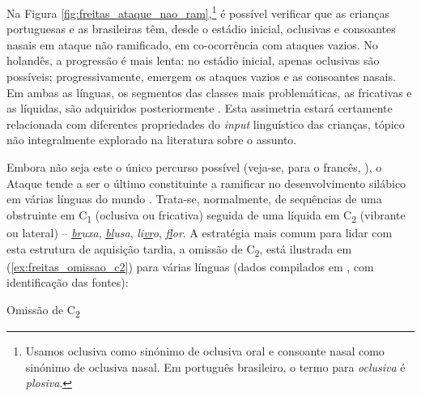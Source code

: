 \documentclass[output=paper]{LSP/langsci}
\begin{document}
Na Figura \ref{fig:freitas_ataque_nao_ram},\footnote{Usamos oclusiva como sinónimo de oclusiva oral e consoante nasal como sinónimo de oclusiva nasal. Em português brasileiro, o termo para \textit{oclusiva} é \textit{plosiva}.} é possível verificar que as crianças portuguesas e as brasileiras têm, desde o estádio inicial, oclusivas e consoantes nasais em ataque não ramificado, em co-ocorrência com ataques vazios. No holandês, a progressão é mais lenta: no estádio inicial, apenas oclusivas são possíveis; progressivamente, emergem os ataques vazios e as consoantes nasais. Em ambas as línguas, os segmentos das classes mais problemáticas, as fricativas e as líquidas, são adquiridos posteriormente \citep{matzenauer1990,freitas1997,costa2010,amorim2014}. Esta assimetria estará certamente relacionada com diferentes propriedades do \textit{input} linguístico das crianças, tópico não integralmente explorado na literatura sobre o assunto.

Embora não seja este o único percurso possível (veja-se, para o francês, \citealt{rose200,almeida2011}), o Ataque tende a ser o último constituinte a ramificar no desenvolvimento silábico em várias línguas do mundo \citep{bernhardtstemberger1998,fikkert2007,demuth2009}. Trata-se, normalmente, de sequências de uma obstruinte em C\textsubscript{1} (oclusiva ou fricativa) seguida de uma líquida em C\textsubscript{2} (vibrante ou lateral) – \textit{\underline{br}uxa}, \textit{\underline{bl}usa}, \textit{li\underline{vr}o}, \textit{\underline{fl}or}. A estratégia mais comum para lidar com esta estrutura de aquisição tardia, a omissão de C\textsubscript{2}, está ilustrada em (\ref{ex:freitas_omissao_c2}) para várias línguas (dados compilados em \citealt{freitas2003}, com identificação das fontes):

\ea\label{ex:freitas_omissao_c2}
Omissão de C\textsubscript{2}
\z
\z
\end{document}
